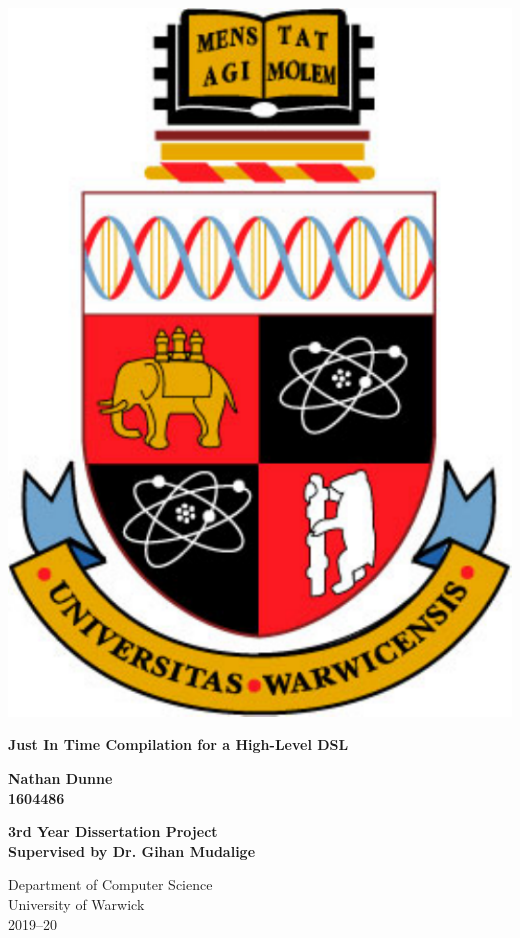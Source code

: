 
\thispagestyle{empty}

\begin{spacing}{2}
	\begin{center}
		\includegraphics[scale = 0.45]{Preamble/WarwickCrest.pdf}
	\end{center}
	\vspace{5mm}
	\begin{center}
		\textbf{\LARGE Just In Time Compilation for a High-Level DSL}
		\vspace{5mm}
	\end{center}
	\begin{center}
		\textbf{\Large Nathan Dunne}\\
		\textbf{\large 1604486}
		\vspace{20mm}
	\end{center}
	\begin{center}
		\textbf{\Large 3rd Year Dissertation Project}\\
		\textbf{\large Supervised by Dr. Gihan Mudalige}\\
		\vspace{20mm}
	\end{center}
	\begin{center}
		{\large Department of Computer Science}\\
		{\large University of Warwick}\\
		{\large 2019--20}
	\end{center}
\end{spacing}

